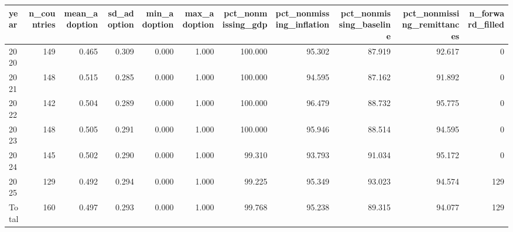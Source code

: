 \begin{tabular}{lrrrrrrrrrr}
\toprule
year & n_countries & mean_adoption & sd_adoption & min_adoption & max_adoption & pct_nonmissing_gdp & pct_nonmissing_inflation & pct_nonmissing_baseline & pct_nonmissing_remittances & n_forward_filled \\
\midrule
2020 & 149 & 0.465 & 0.309 & 0.000 & 1.000 & 100.000 & 95.302 & 87.919 & 92.617 & 0 \\
2021 & 148 & 0.515 & 0.285 & 0.000 & 1.000 & 100.000 & 94.595 & 87.162 & 91.892 & 0 \\
2022 & 142 & 0.504 & 0.289 & 0.000 & 1.000 & 100.000 & 96.479 & 88.732 & 95.775 & 0 \\
2023 & 148 & 0.505 & 0.291 & 0.000 & 1.000 & 100.000 & 95.946 & 88.514 & 94.595 & 0 \\
2024 & 145 & 0.502 & 0.290 & 0.000 & 1.000 & 99.310 & 93.793 & 91.034 & 95.172 & 0 \\
2025 & 129 & 0.492 & 0.294 & 0.000 & 1.000 & 99.225 & 95.349 & 93.023 & 94.574 & 129 \\
Total & 160 & 0.497 & 0.293 & 0.000 & 1.000 & 99.768 & 95.238 & 89.315 & 94.077 & 129 \\
\bottomrule
\end{tabular}
